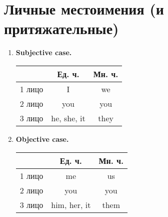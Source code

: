 \documentclass[oneside]{book}
\begin{document}
    \section{Личные местоимения (и притяжательные)}
    \begin{enumerate}
        \item \textbf{Subjective case.}
        \begin{center}
            \begin{tabular}{|c|c|c|}
                \hline

                & Ед. ч. & Мн. ч.
                \\
                \hline

                1 лицо & I & we
                \\
                \hline

                2 лицо & you & you
                \\
                \hline

                3 лицо & he, she, it & they
                \\
                \hline
            \end{tabular}
        \end{center}

        \item \textbf{Objective case.}
        \begin{center}
            \begin{tabular}{|c|c|c|}
                \hline

                & Ед. ч. & Мн. ч.
                \\
                \hline

                1 лицо & me & us
                \\
                \hline

                2 лицо & you & you
                \\
                \hline

                3 лицо & him, her, it & them
                \\
                \hline
            \end{tabular}
        \end{center}


\end{enumerate}
\end{document}
